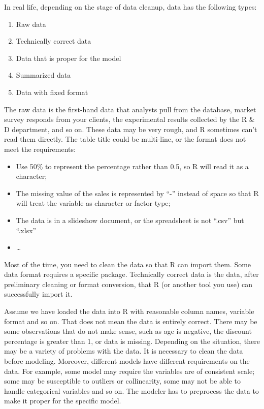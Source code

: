 \documentclass[12pt,]{krantz}
\providecommand{\tightlist}{%
  \setlength{\itemsep}{0pt}\setlength{\parskip}{0pt}}
\theoremstyle{definition}
\theoremstyle{definition}
\theoremstyle{remark}
\begin{document}
In real life, depending on the stage of data cleanup, data has the
following types:

\begin{enumerate}
\def\labelenumi{\arabic{enumi}.}
\tightlist
\item
  Raw data
\item
  Technically correct data
\item
  Data that is proper for the model
\item
  Summarized data
\item
  Data with fixed format
\end{enumerate}

The raw data is the first-hand data that analysts pull from the
database, market survey responds from your clients, the experimental
results collected by the R \& D department, and so on. These data may be
very rough, and R sometimes can't read them directly. The table title
could be multi-line, or the format does not meet the requirements:

\begin{itemize}
\tightlist
\item
  Use 50\% to represent the percentage rather than 0.5, so R will read
  it as a character;
\item
  The missing value of the sales is represented by ``-'' instead of
  space so that R will treat the variable as character or factor type;
\item
  The data is in a slideshow document, or the spreadsheet is not
  ``.csv'' but ``.xlsx''
\item
  \ldots{}
\end{itemize}

Most of the time, you need to clean the data so that R can import them.
Some data format requires a specific package. Technically correct data
is the data, after preliminary cleaning or format conversion, that R (or
another tool you use) can successfully import it.

Assume we have loaded the data into R with reasonable column names,
variable format and so on. That does not mean the data is entirely
correct. There may be some observations that do not make sense, such as
age is negative, the discount percentage is greater than 1, or data is
missing. Depending on the situation, there may be a variety of problems
with the data. It is necessary to clean the data before modeling.
Moreover, different models have different requirements on the data. For
example, some model may require the variables are of consistent scale;
some may be susceptible to outliers or collinearity, some may not be
able to handle categorical variables and so on. The modeler has to
preprocess the data to make it proper for the specific model.
\end{document}
